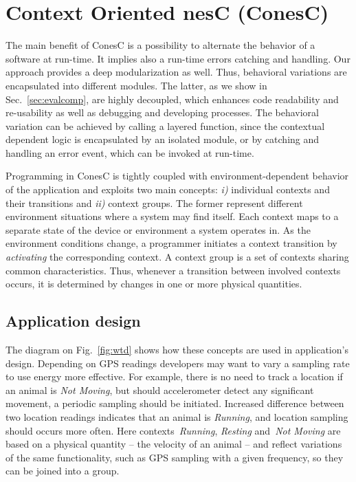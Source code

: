 \section{Context Oriented nesC (ConesC)} 

The main benefit of ConesC is a possibility to alternate the behavior of a software at
run-time. It implies also a run-time errors catching and handling. Our approach
provides a deep modularization as well. Thus, behavioral variations are encapsulated
into different modules. The latter, as we show in Sec.~\ref{sec:evalcomp},
are highly decoupled, which enhances code readability and re-usability as well as debugging
and developing processes. The behavioral variation can be achieved by calling a
layered function, since the contextual dependent logic is encapsulated by an isolated module, or
by catching and handling an error event, which can be invoked at run-time.

Programming in ConesC is tightly coupled with environment-dependent behavior of
the application and exploits two main concepts: \emph{i)} individual contexts
and their transitions and \emph{ii)} context groups. The former represent
different environment situations where a system may find itself. Each context
maps to a separate state of the device or environment a system operates in. As
the environment conditions change, a programmer initiates a context transition
by \emph{activating} the corresponding context. A context group is a set of contexts
sharing common characteristics. Thus, whenever a transition between involved
contexts occurs, it is determined by changes in one or more physical quantities.

\subsection{Application design}

The diagram on Fig.~\ref{fig:wtd} shows how these concepts are used in application's design.
Depending on GPS readings developers may want to vary a sampling rate to use energy
more effective. For example, there is no need to
track a location if an animal is \emph{Not Moving}, but should accelerometer detect any
significant movement, a periodic sampling should be initiated. Increased
difference between two location readings indicates that an animal is
\emph{Running}, and location sampling should occurs more often.
Here contexts~\emph{Running}, \emph{Resting} and~\emph{Not Moving} are based on
a physical quantity -- the velocity of an animal -- and reflect
variations of the same functionality, such as GPS sampling with a given frequency,
so they can be joined into a group.

